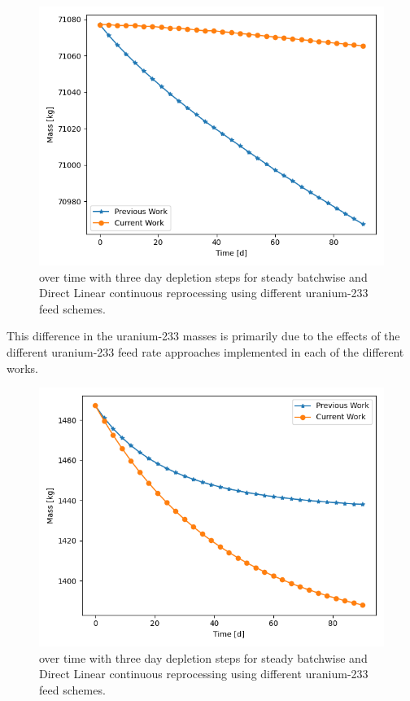 \begin{figure}[H]
  \centering
  \includegraphics[scale=0.7]{images/prev-cur-th232.png}
  \caption{ over time with three day depletion steps for steady batchwise and Direct Linear continuous reprocessing using different uranium-233 feed schemes.}
   \label{fig:prev-cur-th232-plot}
\end{figure}

This difference in the uranium-233 masses is primarily due to the effects of the different uranium-233 feed rate approaches implemented in each of the different works.

\begin{figure}[H]
  \centering
  \includegraphics[scale=0.7]{images/prev-cur-u233.png}
  \caption{ over time with three day depletion steps for steady batchwise and Direct Linear continuous reprocessing using different uranium-233 feed schemes.}
   \label{fig:prev-cur-u233-plot}
\end{figure}

